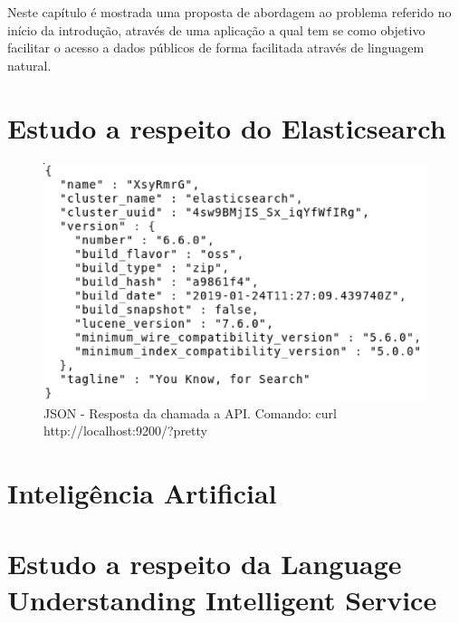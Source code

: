 Neste capítulo é mostrada uma proposta de abordagem ao problema referido no início da introdução, através de uma aplicação a qual tem se como objetivo facilitar o acesso a dados públicos de forma facilitada através de linguagem natural.

\section{Estudo a respeito do Elasticsearch}


\begin{figure}[!htb]
	\caption{\label{pretty}JSON - Resposta da chamada a API. Comando: curl http://localhost:9200/?pretty}
	\begin{center}
		\includegraphics[width=\textwidth]{imagens/pretty.eps}
	\end{center}
\end{figure}

\section{Inteligência Artificial}


\section{Estudo a respeito da Language Understanding Intelligent Service}

